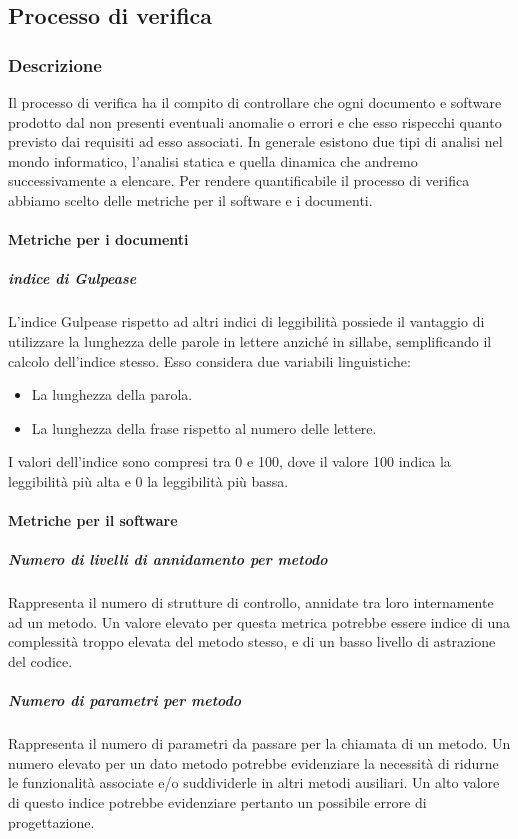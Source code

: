 \subsection{Processo di verifica}
\subsubsection{Descrizione}
Il processo di verifica ha il compito di controllare che ogni documento e software prodotto dal  non presenti eventuali anomalie o errori e che esso rispecchi quanto previsto dai requisiti ad esso associati. In generale esistono due tipi di analisi nel mondo informatico, l'analisi statica e quella dinamica che andremo successivamente a elencare. Per rendere quantificabile il processo di verifica abbiamo scelto delle metriche per il software e i documenti.

\paragraph{Metriche per i documenti}
\subparagraph{indice di Gulpease}
L'indice Gulpease rispetto ad altri indici di leggibilità possiede il vantaggio di utilizzare la lunghezza delle parole in lettere anziché in sillabe, semplificando il calcolo dell'indice stesso. Esso considera due variabili linguistiche:
\begin{itemize}
\item La lunghezza della parola.
\item La lunghezza della frase rispetto al numero delle lettere.
\end{itemize}

I valori dell'indice sono compresi tra 0 e 100, dove il valore 100 indica la leggibilità più alta e 0 la leggibilità più bassa.

\paragraph{Metriche per il software}

\subparagraph{Numero di livelli di annidamento per metodo}
Rappresenta il numero di strutture di controllo, annidate tra loro internamente ad un metodo.
Un valore elevato per questa metrica potrebbe essere indice di una complessità troppo elevata del metodo stesso, e di un basso livello di astrazione del codice.

\subparagraph{Numero di parametri per metodo}
Rappresenta il numero di parametri da passare per la chiamata di un metodo.
Un numero elevato per un dato metodo potrebbe evidenziare la necessità di ridurne le funzionalità associate e/o suddividerle in altri metodi ausiliari.
Un alto valore di questo indice potrebbe evidenziare pertanto un possibile errore di progettazione.

